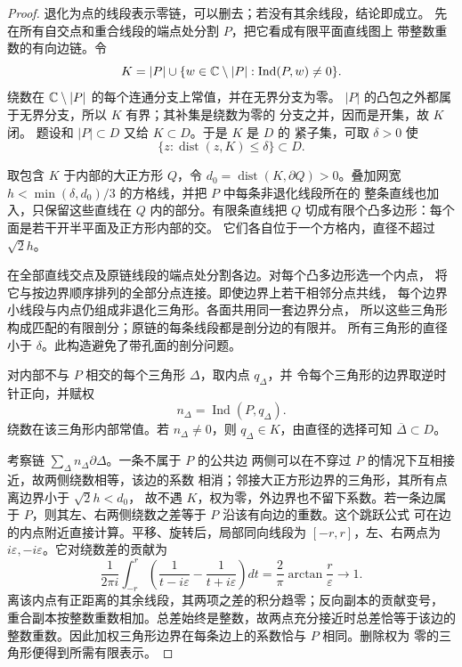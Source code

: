 \begin{proof}
退化为点的线段表示零链，可以删去；若没有其余线段，结论即成立。
先在所有自交点和重合线段的端点处分割 \(P\)，把它看成有限平面直线图上
带整数重数的有向边链。令
\[
 K=|P|\cup
 \{w\in\mathbb{C}\setminus |P|:\operatorname{Ind}(P,w)\ne0\}.
\]
绕数在 \(\mathbb{C}\setminus|P|\) 的每个连通分支上常值，并在无界分支为零。
\(|P|\) 的凸包之外都属于无界分支，所以 \(K\) 有界；其补集是绕数为零的
分支之并，因而是开集，故 \(K\) 闭。
题设和 \(|P|\subset D\) 又给 \(K\subset D\)。于是 \(K\) 是 \(D\) 的
紧子集，可取 \(\delta>0\) 使
\[
 \{z:\operatorname{dist}(z,K)\le\delta\}\subset D.
\]

取包含 \(K\) 于内部的大正方形 \(Q\)，令
\(d_0=\operatorname{dist}(K,\partial Q)>0\)。叠加网宽
\(h<\min(\delta,d_0)/3\) 的方格线，并把 \(P\) 中每条非退化线段所在的
整条直线也加入，只保留这些直线在 \(Q\) 内的部分。有限条直线把 \(Q\)
切成有限个凸多边形：每个面是若干开半平面及正方形内部的交。
它们各自位于一个方格内，直径不超过 \(\sqrt2h\)。

在全部直线交点及原链线段的端点处分割各边。对每个凸多边形选一个内点，
将它与按边界顺序排列的全部分点连接。即使边界上若干相邻分点共线，
每个边界小线段与内点仍组成非退化三角形。各面共用同一套边界分点，
所以这些三角形构成匹配的有限剖分；原链的每条线段都是剖分边的有限并。
所有三角形的直径小于 \(\delta\)。此构造避免了带孔面的剖分问题。

对内部不与 \(P\) 相交的每个三角形 \(\Delta\)，取内点 \(q_\Delta\)，并
令每个三角形的边界取逆时针正向，并赋权
\[
 n_\Delta=\operatorname{Ind}(P,q_\Delta).
\]
绕数在该三角形内部常值。若 \(n_\Delta\ne0\)，则
\(q_\Delta\in K\)，由直径的选择可知
\(\overline\Delta\subset D\)。

考察链 \(\sum_\Delta n_\Delta\partial\Delta\)。一条不属于 \(P\) 的公共边
两侧可以在不穿过 \(P\) 的情况下互相接近，故两侧绕数相等，该边的系数
相消；邻接大正方形边界的三角形，其所有点离边界小于 \(\sqrt2h<d_0\)，
故不遇 \(K\)，权为零，外边界也不留下系数。若一条边属于
\(P\)，则其左、右两侧绕数之差等于 \(P\) 沿该有向边的重数。这个跳跃公式
可在边的内点附近直接计算。平移、旋转后，局部同向线段为
\([-r,r]\)，左、右两点为 \(i\varepsilon,-i\varepsilon\)。它对绕数差的贡献为
\[
 \frac1{2\pi i}\int_{-r}^r
 \left(\frac1{t-i\varepsilon}-\frac1{t+i\varepsilon}\right)dt
 =\frac2\pi\arctan\frac r\varepsilon\longrightarrow1.
\]
离该内点有正距离的其余线段，其两项之差的积分趋零；反向副本的贡献变号，
重合副本按整数重数相加。总差始终是整数，故两点充分接近时总差恰等于该边的
整数重数。因此加权三角形边界在每条边上的系数恰与 \(P\) 相同。删除权为
零的三角形便得到所需有限表示。
\end{proof}

